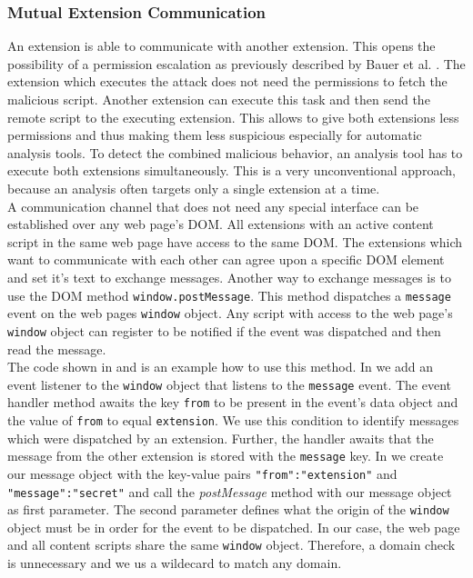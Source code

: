 		\subsubsection{Mutual Extension Communication}
				
			An extension is able to communicate with another extension. This opens the possibility of a permission escalation as previously described by Bauer et al. \cite{extensions:cns14}. The extension which executes the attack does not need the permissions to fetch the malicious script. Another extension can execute this task and then send the remote script to the executing extension. This allows to give both extensions less permissions and thus making them less suspicious especially for automatic analysis tools. To detect the combined malicious behavior, an analysis tool has to execute both extensions simultaneously. This is a very unconventional approach, because an analysis often targets only a single extension at a time. \\
			
			A communication channel that does not need any special interface can be established over any web page's DOM. All extensions with an active content script in the same web page have access to the same DOM. The extensions which want to communicate with each other can agree upon a specific DOM element and set it's text to exchange messages. Another way to exchange messages is to use the DOM method \texttt{window.postMessage}. This method dispatches a \texttt{message} event on the web pages \texttt{window} object. Any script with access to the web page's \texttt{window} object can register to be notified if the event was dispatched and then read the message. \\
			
			The code shown in  and  is an example how to use this method. In  we add an event listener to the \texttt{window} object that listens to the \texttt{message} event. The event handler method awaits the key \texttt{from} to be present in the event's data object and the value of \texttt{from} to equal \texttt{extension}. We use this condition to identify messages which were dispatched by an extension. Further, the handler awaits that the message from the other extension is stored with the \texttt{message} key. In  we create our message object with the key-value pairs \texttt{"from":"extension"} and \texttt{"message":"secret"} and call the \textit{postMessage} method with our message object as first parameter. The second parameter defines what the origin of the \texttt{window} object must be in order for the event to be dispatched. In our case, the web page and all content scripts share the same \texttt{window} object. Therefore, a domain check is unnecessary and we us a wildecard to match any domain.
			
